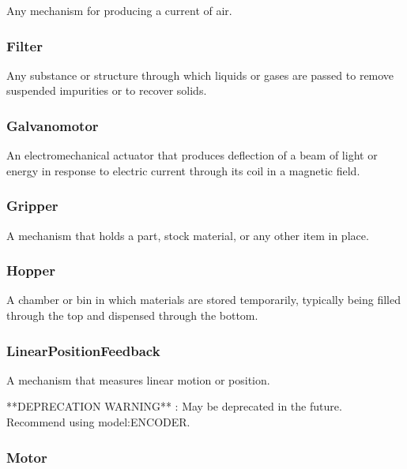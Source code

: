 Any mechanism for producing a current of air.

\FloatBarrier

\subsubsection{Filter}
  \label{sec:Filter}


Any substance or structure through which liquids or gases are passed to remove suspended impurities or to recover solids.

\FloatBarrier

\subsubsection{Galvanomotor}
  \label{sec:Galvanomotor}


An electromechanical actuator that produces deflection of a beam of light or energy in response to electric current through its coil in a magnetic field.

\FloatBarrier

\subsubsection{Gripper}
  \label{sec:Gripper}


A mechanism that holds a part, stock material, or any other item in place.

\FloatBarrier

\subsubsection{Hopper}
  \label{sec:Hopper}


A chamber or bin in which materials are stored temporarily, typically being filled through the top and dispensed through the bottom.

\FloatBarrier

\subsubsection{LinearPositionFeedback}
  \label{sec:LinearPositionFeedback}


A mechanism that measures linear motion or position.

**DEPRECATION WARNING** : May be deprecated in the future. Recommend using {model:ENCODER}.

\FloatBarrier

\subsubsection{Motor}
  \label{sec:Motor}


